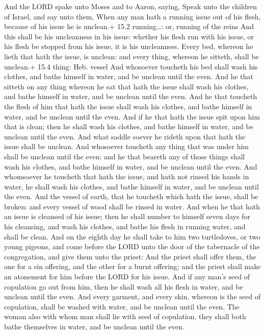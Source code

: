  And the LORD spake unto Moses and to Aaron, saying,
 Speak unto the children of Israel, and say unto them, When
any man hath a running issue out of his flesh, because of his issue he
is unclean.+ 15.2 running\ldots: or, running of the reins 
And this shall be his uncleanness in his issue: whether his flesh run
with his issue, or his flesh be stopped from his issue, it is his
uncleanness.  Every bed, whereon he lieth that hath the
issue, is unclean: and every thing, whereon he sitteth, shall be
unclean.+ 15.4 thing: Heb. vessel  And whosoever toucheth
his bed shall wash his clothes, and bathe himself in water, and be
unclean until the even.  And he that sitteth on any thing
whereon he sat that hath the issue shall wash his clothes, and bathe
himself in water, and be unclean until the even.  And he
that toucheth the flesh of him that hath the issue shall wash his
clothes, and bathe himself in water, and be unclean until the even.
 And if he that hath the issue spit upon him that is clean;
then he shall wash his clothes, and bathe himself in water, and be
unclean until the even.  And what saddle soever he rideth
upon that hath the issue shall be unclean.  And whosoever
toucheth any thing that was under him shall be unclean until the even:
and he that beareth any of those things shall wash his clothes, and
bathe himself in water, and be unclean until the even.  And
whomsoever he toucheth that hath the issue, and hath not rinsed his
hands in water, he shall wash his clothes, and bathe himself in water,
and be unclean until the even.  And the vessel of earth,
that he toucheth which hath the issue, shall be broken: and every vessel
of wood shall be rinsed in water.  And when he that hath an
issue is cleansed of his issue; then he shall number to himself seven
days for his cleansing, and wash his clothes, and bathe his flesh in
running water, and shall be clean.  And on the eighth day
he shall take to him two turtledoves, or two young pigeons, and come
before the LORD unto the door of the tabernacle of the congregation, and
give them unto the priest:  And the priest shall offer
them, the one for a sin offering, and the other for a burnt offering;
and the priest shall make an atonement for him before the LORD for his
issue.  And if any man's seed of copulation go out from
him, then he shall wash all his flesh in water, and be unclean until the
even.  And every garment, and every skin, whereon is the
seed of copulation, shall be washed with water, and be unclean until the
even.  The woman also with whom man shall lie with seed of
copulation, they shall both bathe themselves in water, and be unclean
until the even.

